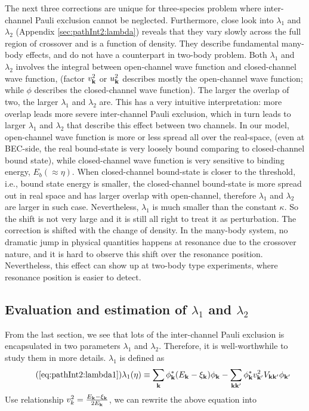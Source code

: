 The next three corrections are unique for three-species problem where inter-channel Pauli exclusion cannot be neglected.  
Furthermore,  close look into $\lambda_1$ and $\lambda_2$ (Appendix \ref{sec:pathInt2:lambda}) reveals that they vary slowly across the full region of crossover and is a function of density.  They describe  fundamental many-body effects, and do not have a counterpart in two-body problem.  
Both $\lambda_{1}$ and $\lambda_{2}$ involves the integral between open-channel wave function and closed-channel wave function, (factor $v_{\mathbf{k}}^{2}$ or $u_{\mathbf{k}}^{2}$ describes mostly the open-channel wave function; while $\phi$ describes the closed-channel wave function). The larger the overlap of two, the larger $\lambda_{1}$ and $\lambda_{2}$ are.  This has a very intuitive interpretation:  more overlap leads more severe inter-channel Pauli exclusion, which in turn leads to larger $\lambda_{1}$ and $\lambda_{2}$ that describe this effect between two  channels.  In our model, open-channel wave function is more or less spread all over the real-space, (even at BEC-side, the real bound-state is very loosely bound comparing to closed-channel bound state), while closed-channel wave function is very sensitive to binding energy, $E_{b}(\approx\eta)$.  When  closed-channel  bound-state is closer to the threshold, i.e.,  bound state energy  is smaller, the closed-channel bound-state is more spread out  in real space and has larger overlap with open-channel, therefore $\lambda_{1}$ and $\lambda_{2}$ are larger in such case.                           Nevertheless, $\lambda_1$ is much smaller than the  constant $\kappa$.  So the shift is not very large and it is still all right to treat it as perturbation.  The correction is   shifted with the change of density.  In the many-body system, no dramatic jump in physical quantities happens at resonance due to the crossover nature, and it is hard to observe this shift over the resonance position.  Nevertheless, this effect can show up at two-body type experiments, where resonance position is easier to detect.  


\subsection{Evaluation and estimation of $\lambda_{1}$ and $\lambda_{2}$\label{sec:pathInt2:lambda}}
From the last section, we  see  that lots of the inter-channel Pauli exclusion is encapsulated in two parameters $\lambda_{1}$ and $\lambda_{2}$.   Therefore, it is well-worthwhile to study them in more details.  $\lambda_{1}$ is defined as 
\begin{equation}\tag{\ref{eq:pathInt2:lambda1}}
\lambda_{1}(\eta)\equiv\sum_{\vk}{\phi_{\vk}^{*}}{(E_{\vk}-\xi_{\vk})}\phi_{\vk}
	-\sum_{\vk\vk'}{\phi_{\vk}^{*}}{v_{\vk'}^{2}V_{\vk\vk'}}\phi_{\vk'}
\end{equation}
Use relationship $v_{k}^{2}=\frac{E_{\mathbf{k}}-\xi_{\mathbf{k}}}{2E_{\mathbf{k}}}$, we can rewrite the above equation into 

